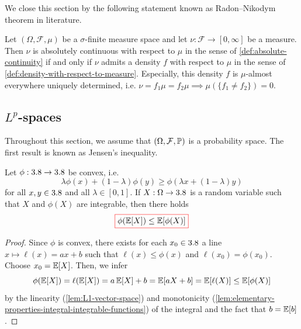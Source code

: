 We close this section by the following statement known as Radon--Nikodym theorem in literature.

\begin{fact}\label{fact:radon-nikodym}
Let $(\Omega,\mathcal{F},\mu)$ be a $\sigma$-finite measure space and let $\nu : \mathcal{F} \to [0,\infty]$ be a measure.
Then $\nu$ is absolutely continuous with respect to $\mu$ in the sense of \autoref{def:absolute-continuity} if and only if $\nu$ admits a density $f$ with respect to $\mu$ in the sense of \autoref{def:density-with-respect-to-measure}.
Especially, this density $f$ is $\mu$-almost everywhere uniquely determined, i.e.
$\nu = f_1\mu = f_2\mu \implies \mu(\{f_1 \neq f_2\})=0$.
\end{fact}

\subsection{$L^p$-spaces}

Throughout this section, we assume that $(\Omega,\mathcal{F},\mathbb{P})$ is a probability space.
The first result is known as Jensen's inequality.

\begin{theorem}\label{thm:jensen}
Let $\phi : 3.8 \to 3.8$ be convex, i.e.
\[
\lambda\phi(x)+(1-\lambda)\phi(y)
\geq
\phi(\lambda x+(1-\lambda)y)
\]
for all $x,y \in 3.8$ and all $\lambda \in [0,1]$.
If $X : \Omega \to 3.8$ is a random variable such that $X$ and $\phi(X)$ are integrable, then there holds
\begin{equation}\label{eq:jensen}
{\color{red}\boxed{\color{black}
\phi(\operatorname{\mathbb{E}}[X])
\leq
\operatorname{\mathbb{E}}[\phi(X)]
}}
\qedhere
\end{equation}
\end{theorem}
\begin{proof}
Since $\phi$ is convex, there exists for each $x_0 \in 3.8$ a line $x \mapsto \ell(x) = ax+b$ such that $\ell(x) \leq \phi(x)$ and $\ell(x_0)=\phi(x_0)$.
Choose $x_0 = \operatorname{\mathbb{E}}[X]$.
Then, we infer
\[
\phi(\operatorname{\mathbb{E}}[X])
=
\ell(\operatorname{\mathbb{E}}[X])
=
a\operatorname{\mathbb{E}}[X]+b
=
\operatorname{\mathbb{E}}[aX+b]
=
\operatorname{\mathbb{E}}[\ell(X)]
\leq
\operatorname{\mathbb{E}}[\phi(X)]
\]
by the linearity (\autoref{lem:L1-vector-space}) and monotonicity (\autoref{lem:elementary-properties-integral-integrable-functions}) of the integral and the fact that $b = \operatorname{\mathbb{E}}[b]$.
\end{proof}

